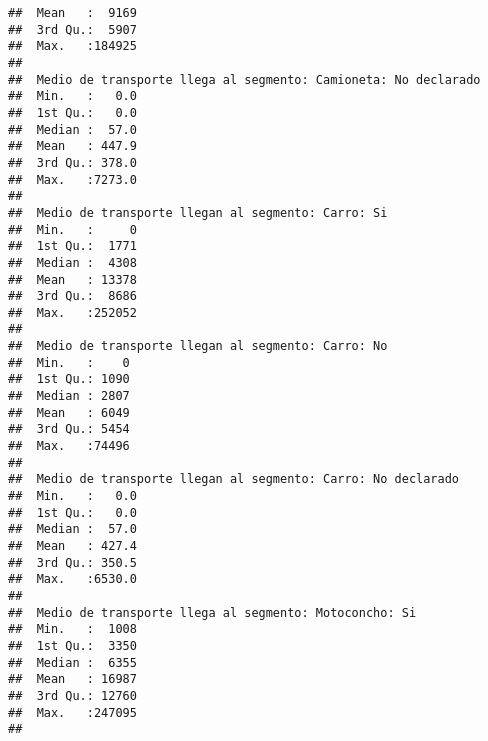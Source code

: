 \documentclass[11pt,]{article}
\begin{document}
\begin{verbatim}
##  Mean   :  9169                                      
##  3rd Qu.:  5907                                      
##  Max.   :184925                                      
##                                                      
##  Medio de transporte llega al segmento: Camioneta: No declarado
##  Min.   :   0.0                                                
##  1st Qu.:   0.0                                                
##  Median :  57.0                                                
##  Mean   : 447.9                                                
##  3rd Qu.: 378.0                                                
##  Max.   :7273.0                                                
##                                                                
##  Medio de transporte llegan al segmento: Carro: Si
##  Min.   :     0                                   
##  1st Qu.:  1771                                   
##  Median :  4308                                   
##  Mean   : 13378                                   
##  3rd Qu.:  8686                                   
##  Max.   :252052                                   
##                                                   
##  Medio de transporte llegan al segmento: Carro: No
##  Min.   :    0                                    
##  1st Qu.: 1090                                    
##  Median : 2807                                    
##  Mean   : 6049                                    
##  3rd Qu.: 5454                                    
##  Max.   :74496                                    
##                                                   
##  Medio de transporte llegan al segmento: Carro: No declarado
##  Min.   :   0.0                                             
##  1st Qu.:   0.0                                             
##  Median :  57.0                                             
##  Mean   : 427.4                                             
##  3rd Qu.: 350.5                                             
##  Max.   :6530.0                                             
##                                                             
##  Medio de transporte llega al segmento: Motoconcho: Si
##  Min.   :  1008                                       
##  1st Qu.:  3350                                       
##  Median :  6355                                       
##  Mean   : 16987                                       
##  3rd Qu.: 12760                                       
##  Max.   :247095                                       
##                                                       

\end{verbatim}
\end{document}

